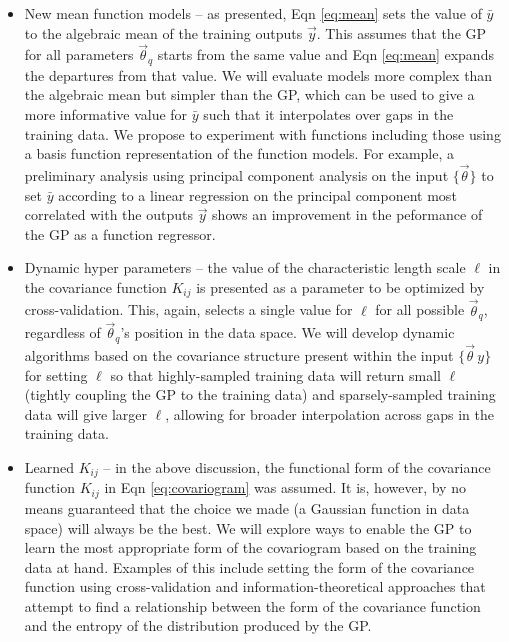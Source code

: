 \documentclass[prd,nofootbib,floatfix,11pt,tightenlines,nofootinbib]{revtex4}
\begin{document}
\vspace{.5\baselineskip}
\begin{itemize}
\item New mean function models -- as presented,
Eqn \ref{eq:mean} sets the value of $\bar{y}$ to the algebraic mean of the
training outputs $\vec{y}$.  This assumes that the GP for all 
parameters $\vec{\theta}_q$
starts from the same value and Eqn \ref{eq:mean} expands the
departures from that value.  
We will evaluate models more complex than the algebraic
mean but simpler than the GP, which can be used to give a more informative value
for $\bar{y}$ such that it interpolates over gaps in the training data.  We propose
to experiment with functions including those using a basis
function representation of the function models. For example, a preliminary analysis using
 principal component
analysis on the input $\{\vec{\theta}\}$ to set $\bar{y}$ according to a linear
regression on the principal component most correlated 
with the outputs $\vec{y}$
shows an  improvement in the peformance of
the GP as a function regressor.

\item Dynamic hyper parameters -- the value of the characteristic
length scale $\ell$ in the covariance function $K_{ij}$ is presented
as a parameter to be optimized by cross-validation.  This, again, selects a
single value for $\ell$ for all possible $\vec{\theta}_q$, regardless of
$\vec{\theta}_q$'s position in the data space.  We will develop 
dynamic algorithms based on the covariance
structure present within the input $\{\vec{\theta}\,y\}$  
for setting $\ell$ so that highly-sampled 
training data will
return small $\ell$ (tightly coupling the GP to the training data) and
sparsely-sampled training data will give larger $\ell$, allowing for broader
interpolation across gaps in the training data.

\item Learned $K_{ij}$ -- in the above discussion, the functional form of
the covariance function
$K_{ij}$ in Eqn \ref{eq:covariogram}
was assumed.  
It is, however, by no means guaranteed that the choice we made (a Gaussian
function in data space) will always be the best.  
We will explore ways
to enable the GP to learn the most appropriate form of 
the covariogram
based on the training data at hand. Examples of this include setting the
form of the covariance function
using cross-validation and information-theoretical
approaches that attempt to find a relationship between the form of the covariance
function and the entropy of the distribution produced by the GP.
\end{itemize}
\vspace{.5\baselineskip}
\end{document}
